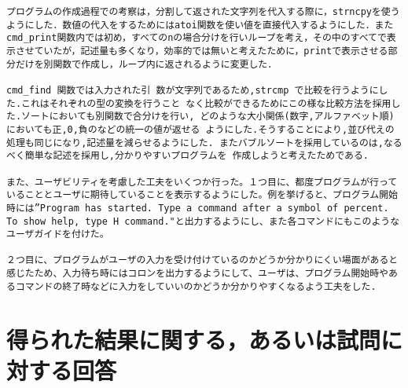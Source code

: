 \documentclass[a4j]{jarticle}
\begin{document}
\begin{verbatim}
プログラムの作成過程での考察は，分割して返された文字列を代入する際に，strncpyを使うようにした．数値の代入をするためにはatoi関数を使い値を直接代入するようにした．またcmd_print関数内では初め，すべてのnの場合分けを行いループを考え，その中のすべてで表示させていたが，記述量も多くなり，効率的では無いと考えたために，printで表示させる部分だけを別関数で作成し，ループ内に返されるように変更した．

cmd_find 関数では入力された引 数が文字列であるため,strcmp で比較を行うようにした.これはそれぞれの型の変換を行うこと なく比較ができるためにこの様な比較方法を採用した.ソートにおいても別関数で合分けを行い, どのような大小関係(数字,アルファベット順)においても正,0,負のなどの統一の値が返せる ようにした.そうすることにより,並び代えの処理も同じになり,記述量を減らせるようにした. またバブルソートを採用しているのは,なるべく簡単な記述を採用し,分かりやすいプログラムを 作成しようと考えたためである.

また、ユーザビリティを考慮した工夫をいくつか行った。１つ目に、都度プログラムが行っていることとユーザに期待していることを表示するようにした。例を挙げると、プログラム開始時には”Program has started. Type a command after a symbol of percent. To show help, type H command."と出力するようにし、また各コマンドにもこのようなユーザガイドを付けた。

２つ目に、プログラムがユーザの入力を受け付けているのかどうか分かりにくい場面があると感じたため、入力待ち時にはコロンを出力するようにして、ユーザは、プログラム開始時やあるコマンドの終了時などに入力をしていいのかどうか分かりやすくなるよう工夫をした.

\end{verbatim}

%
%

\section{得られた結果に関する，あるいは試問に対する回答}
\end{document}
